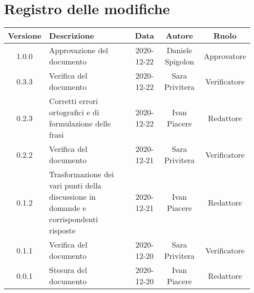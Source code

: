 \section*{Registro delle modifiche}

\begin{center}
	\begin{longtable}{|c|p{5cm}|c|c|c|}
	\hline
	\rowcolor{lighter-grayer}
	\textbf{Versione} & \textbf{Descrizione} & \textbf{Data} & \textbf{Autore} & \textbf{Ruolo} \\
	\hline
	\endfirsthead

	
	1.0.0 & Approvazione del documento & 2020-12-22 & Daniele Spigolon & Approvatore \\
	\hline
	0.3.3 & Verifica del documento & 2020-12-22 & Sara Privitera & Verificatore \\
	\hline
	0.2.3 & Corretti errori ortografici e di formulazione delle frasi & 2020-12-22 & Ivan Piacere & Redattore \\
	\hline
	0.2.2 & Verifica del documento & 2020-12-21 & Sara Privitera & Verificatore \\
	\hline
	0.1.2 & Trasformazione dei vari punti della discussione in domande e corrispondenti risposte & 2020-12-21 & Ivan Piacere & Redattore \\
	\hline
	0.1.1 & Verifica del documento & 2020-12-20 & Sara Privitera & Verificatore \\
	\hline
	0.0.1 & Stesura del documento & 2020-12-20 & Ivan Piacere & Redattore \\
	\hline
	\end{longtable}
\end{center}
